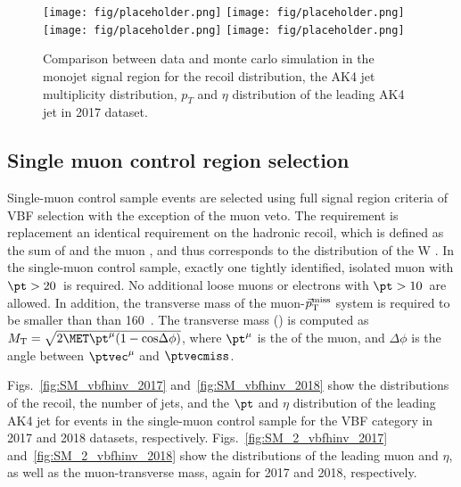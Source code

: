 {\begin{figure}[htbp]
    \begin{center}
        \texttt{[image: fig/placeholder.png]}
        \texttt{[image: fig/placeholder.png]} \\
        \texttt{[image: fig/placeholder.png]}
        \texttt{[image: fig/placeholder.png]}
    \end{center}
    \caption{Comparison between data and monte carlo simulation in the monojet signal region for
        the recoil distribution, the AK4 jet multiplicity distribution,  $p_T$ and $\eta$
        distribution of the leading AK4  jet in 2017 dataset.}
    \label{fig:SR_pre_monoV_2018}
\end{figure}

\newpage

\subsection{Single muon control region selection}
\label{sec:selection_cr_1m}

Single-muon control sample events are selected using full signal region criteria of VBF selection with the exception of the muon veto. 
The \ptmiss requirement is replacement an identical requirement on the hadronic recoil, which is defined as the sum of \ptvecmiss and the muon \vpt, 
and thus corresponds to the distribution of the W \pt.
In the single-muon control sample, exactly one tightly identified, isolated muon with $\pt > 20$~\GeV is required. 
No additional loose muons or electrons with $\pt > 10$~\GeV are allowed.
In addition, the transverse mass of the muon-$\vec p_{\rm T}^{\rm miss}$ system is required to be smaller than than 160~\GeV.
The transverse mass (\mt) is computed as $\mt = \sqrt{2\MET \pt^{\mu} (1 - \mathrm{cos}\Delta\phi)}$, 
where $\pt^{\mu}$ is the \pt of the muon, and $\Delta\phi$ is the angle between $\ptvec^{\mu}$ and $\ptvecmiss$.


Figs.~\ref{fig:SM_vbfhinv_2017} and~\ref{fig:SM_vbfhinv_2018} show the distributions of the recoil, 
the number of jets, and the $\pt$ and $\eta$ distribution of the leading AK4 jet
for events in the single-muon control sample for the VBF category in 2017 and 2018 datasets, respectively. 
Figs.~\ref{fig:SM_2_vbfhinv_2017} and~\ref{fig:SM_2_vbfhinv_2018} show the distributions of the leading muon \pt and $\eta$, 
as well as the muon-\ptmiss transverse mass, again for 2017 and 2018, respectively.


}
